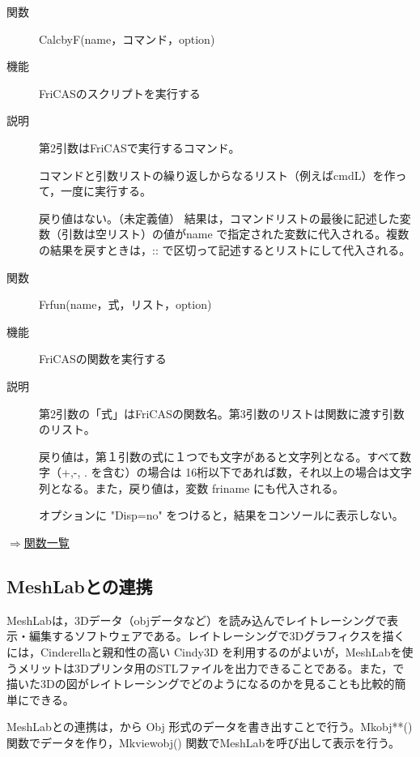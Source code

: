 \documentclass[papersize,a4paper,12pt,uplatex]{jsarticle}
\begin{document}
\begin{description}

\hypertarget{calcbyF}{}
\item[関数]  CalcbyF(name，コマンド，option)
\item[機能]  FriCASのスクリプトを実行する
\item[説明]  第2引数はFriCASで実行するコマンド。

コマンドと引数リストの繰り返しからなるリスト（例えばcmdL）を作って，一度に実行する。

戻り値はない。（未定義値）  結果は，コマンドリストの最後に記述した変数（引数は空リスト）の値がname で指定された変数に代入される。複数の結果を戻すときは，:: で区切って記述するとリストにして代入される。


\vspace{\baselineskip}
\hypertarget{frfun}{}
\item[関数]  Frfun(name，式，リスト，option)
\item[機能]  FriCASの関数を実行する
\item[説明]  第2引数の「式」はFriCASの関数名。第3引数のリストは関数に渡す引数のリスト。

戻り値は，第１引数の式に１つでも文字があると文字列となる。すべて数字（+,-, . を含む）の場合は
16桁以下であれば数，それ以上の場合は文字列となる。また，戻り値は，変数 friname にも代入される。

オプションに "Disp=no" をつけると，結果をコンソールに表示しない。


\end{description}
\begin{flushright}  \hyperlink{functionlist}{$\Rightarrow$関数一覧}\end{flushright}

\newpage

\subsection{MeshLabとの連携}

MeshLabは，3Dデータ（objデータなど）を読み込んでレイトレーシングで表示・編集するソフトウェアである。レイトレーシングで3Dグラフィクスを描くには，Cinderellaと親和性の高い Cindy3D を利用するのがよいが，MeshLabを使うメリットは3Dプリンタ用のSTLファイルを出力できることである。また，\ketcindy で描いた3Dの図がレイトレーシングでどのようになるのかを見ることも比較的簡単にできる。

MeshLabとの連携は，\ketcindy から Obj 形式のデータを書き出すことで行う。Mkobj**() 関数でデータを作り，Mkviewobj() 関数でMeshLabを呼び出して表示を行う。
  
\end{document}
